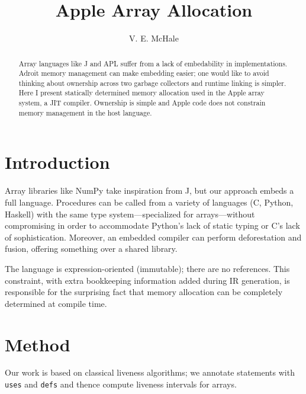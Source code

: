 \documentclass[sigplan,screen]{acmart}
\begin{document}
\begin{abstract}
    Array languages like J and APL suffer from a lack of embedability in implementations. Adroit memory management can make embedding easier; one would like to avoid thinking about ownership across two garbage collectors and runtime linking is simpler. Here I present statically determined memory allocation used in the Apple array system, a JIT compiler. Ownership is simple and Apple code does not constrain memory management in the host language.
\end{abstract}

\title{Apple Array Allocation}
\author{V. E. McHale}
\maketitle

\section{Introduction}

Array libraries like NumPy take inspiration from J, but our approach embeds a full language. Procedures can be called from a variety of languages (C, Python, Haskell) with the same type system---specialized for arrays---without compromising in order to accommodate Python's lack of static typing or C's lack of sophistication. Moreover, an embedded compiler can perform deforestation and fusion, offering something over a shared library.


The language is expression-oriented (immutable); there are no references. This constraint, with extra bookkeeping information added during IR generation, is responsible for the surprising fact that memory allocation can be completely determined at compile time.

\section{Method}

Our work is based on classical liveness algorithms; we annotate statements with {\tt uses} and {\tt defs} and thence compute liveness intervals for arrays.

\end{document}
